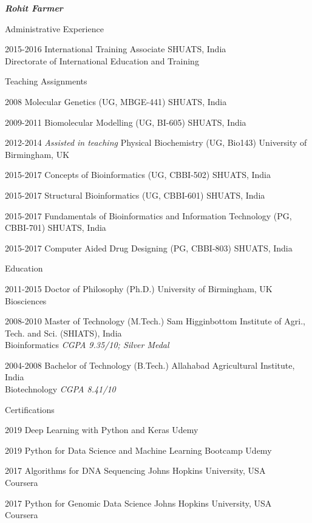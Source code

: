 \documentclass[10pt]{article}
\begin{document}
\begin{cv}{\huge \it \bfseries Rohit Farmer}
\begin{cvlist}{Administrative Experience}
	\item[2015-2016] International Training Associate \hfill SHUATS, India \\  \hspace*{\fill} Directorate of International Education and Training
\end{cvlist}

\begin{cvlist}{Teaching Assignments}
	\item[2008] Molecular Genetics (UG, MBGE-441) \hfill SHUATS, India 
	\item[2009-2011] Biomolecular Modelling (UG, BI-605)  \hfill SHUATS, India
	\item[2012-2014] \emph{Assisted in teaching} Physical Biochemistry (UG, Bio143) \hfill University of Birmingham, UK
	\item[2015-2017] Concepts of Bioinformatics (UG, CBBI-502) \hfill SHUATS, India 
	\item[2015-2017] Structural Bioinformatics (UG, CBBI-601)  \hfill SHUATS, India 
	\item[2015-2017] Fundamentals of Bioinformatics and Information Technology (PG, CBBI-701) \hfill SHUATS, India
	\item[2015-2017] Computer Aided Drug Designing (PG, CBBI-803) \hfill SHUATS, India
\end{cvlist}

\begin{cvlist}{Education}
	\item[2011-2015] Doctor of Philosophy (Ph.D.) \hfill University of Birmingham, UK \\ Biosciences
	\item[2008-2010] Master of Technology (M.Tech.) \hfill Sam Higginbottom Institute of Agri., Tech. and Sci. (SHIATS), India  \\ Bioinformatics \emph{CGPA 9.35/10; Silver Medal}
	\item[2004-2008] Bachelor of Technology (B.Tech.) \hfill Allahabad Agricultural Institute, India  \\ Biotechnology \emph{CGPA 8.41/10}
\end{cvlist}

\begin{cvlist}{Certifications}
        \item[2019] Deep Learning with Python and Keras \hfill Udemy	
        \item[2019] Python for Data Science and Machine Learning Bootcamp \hfil Udemy
        \item[2017] Algorithms for DNA Sequencing \hfill Johns Hopkins University, USA  \\ \hspace*{\fill} Coursera
	\item[2017] Python for Genomic Data Science \hfill Johns Hopkins University, USA  \\ \hspace*{\fill} Coursera
\end{cvlist}


\end{cv}
\end{document}
